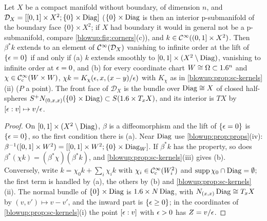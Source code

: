 \begin{corollary}\label{blowup:cor:sc-manifold}
Let $X$ be a compact manifold without boundary, of dimension $n$, and
$\mathcal D_X=[[0,1]\times X^2;\{0\}\times\operatorname{Diag}]$ \textup{(}$\{0\}\times\operatorname{Diag}$ is then an
interior p-submanifold of the boundary face $\{0\}\times X^2$; if $X$ had boundary it would
in general not be a p-submanifold, compare \cref{blowup:fig:corners}(c)\textup{)},
and $k\in\mathcal{C}^\infty((0,1]\times X^2)$. Then $\beta^*k$ extends to an element of $\mathcal{C}^\infty(\mathcal
D_X)$ vanishing to infinite order at the lift of $\{\epsilon=0\}$ if and only if
\textup{(a)} $k$ extends smoothly to $[0,1]\times(X^2\setminus\operatorname{Diag})$, vanishing to
infinite order at $\epsilon=0$, and \textup{(b)} for every coordinate chart $W\cong\Omega
\subset1.6^n$ and $\chi\in\mathcal{C}^\infty_{\mathrm{c}}(W\times W)$, $\chi k=K_\chi(\epsilon,x,(x-y)/\epsilon)$ with $K_\chi$
as in \cref{blowup:prop:sc-kernels}(ii) \textup{(}$P$ a point\textup{)}. The front face of
$\mathcal D_X$ is the bundle over $\operatorname{Diag}\cong X$ of closed half-spheres
$S^+N_{(0,x,x)}(\{0\}\times\operatorname{Diag})\subset S(1.6\times T_xX)$, and its interior is $TX$ by
$[\epsilon:v]\mapsto v/\epsilon$.
\end{corollary}
\begin{proof}
On $[0,1]\times(X^2\setminus\operatorname{Diag})$, $\beta$ is a diffeomorphism and the lift of
$\{\epsilon=0\}$ is $\{\epsilon=0\}$, so the first condition there is (a). Near $\operatorname{Diag}$ use
\cref{blowup:prop:props}(iv): $\beta^{-1}([0,1]\times W^2)=[[0,1]\times W^2;\{0\}\times\operatorname{Diag}_W]$.
If $\beta^*k$ has the property, so does $\beta^*(\chi k)=(\beta^*\chi)(\beta^*k)$, and
\cref{blowup:prop:sc-kernels}(iii) gives (b). Conversely, write $k=\chi_0k+\sum_i\chi_ik$
with $\chi_i\in\mathcal{C}^\infty_{\mathrm{c}}(W_i^2)$ and $\operatorname{supp}\chi_0\cap\operatorname{Diag}=\emptyset$; the first term is handled by
(a), the others by (b) and \cref{blowup:prop:sc-kernels}(ii). The normal bundle of
$\{0\}\times\operatorname{Diag}$ is $1.6\times N\operatorname{Diag}$, with $N_{(x,x)}\operatorname{Diag}\cong T_xX$ by
$(v,v')\mapsto v-v'$, and the inward part is $\{\epsilon\ge0\}$; in the coordinates of
\cref{blowup:prop:sc-kernels}(i) the point $[\epsilon:v]$ with $\epsilon>0$ has $Z=v/\epsilon$.
\end{proof}

